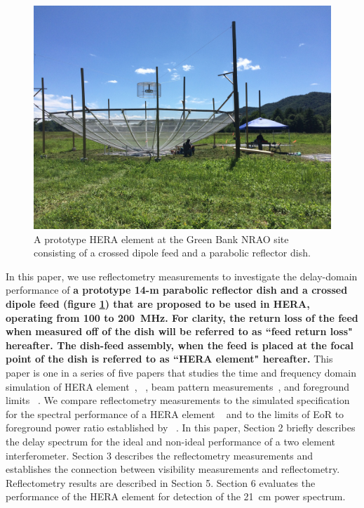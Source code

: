 \documentclass[twocolumn]{emulateapj}
\begin{document}
    \begin{figure}
    \centering
    \includegraphics[trim={2cm 20cm 30cm 15cm},clip, totalheight=0.3\textheight]{plots/heradish.jpg}
    \caption{A prototype HERA element at the Green Bank NRAO site consisting of a crossed dipole feed and a parabolic reflector dish.}
    \label{fig:heradish}
    \end{figure}
    In this paper, we use reflectometry measurements to
    investigate the delay-domain performance of 
    \textbf{a prototype 14-m parabolic reflector dish and a crossed dipole feed (figure \ref{fig:heradish}) that are proposed to be used in HERA, operating 
    from 100 to 200~MHz. For clarity, the return loss of the feed when measured off of the dish will be referred to as ``feed return loss" hereafter. The dish-feed assembly, when the feed is placed at the focal point of the dish is referred to as ``HERA element" hereafter. }
    This paper is one in a series of five papers that studies the time and frequency domain simulation of  HERA element~\citep{Ewall-Wice_et_al2016}, ~\citep{ddboer_et_al2016}, beam pattern measurements~\citep{Neben_et_al2016}, and foreground limits ~\citep{Thyagarajan_et_al2016}. We compare 
    reflectometry measurements to the simulated specification for the spectral performance of a HERA element ~\citep{ddboer_et_al2016} and to the limits of EoR to foreground power ratio established by ~\citep{Thyagarajan_et_al2016}. 
    In this paper, Section 2 briefly describes the delay spectrum for the ideal and
    non-ideal performance of a two element interferometer. Section 3 describes the
    reflectometry measurements and establishes the connection between visibility
    measurements and reflectometry. Reflectometry results are described in Section
    5. Section 6 evaluates the performance of the HERA element for detection of the
    21~cm power spectrum.
    
\end{document}
